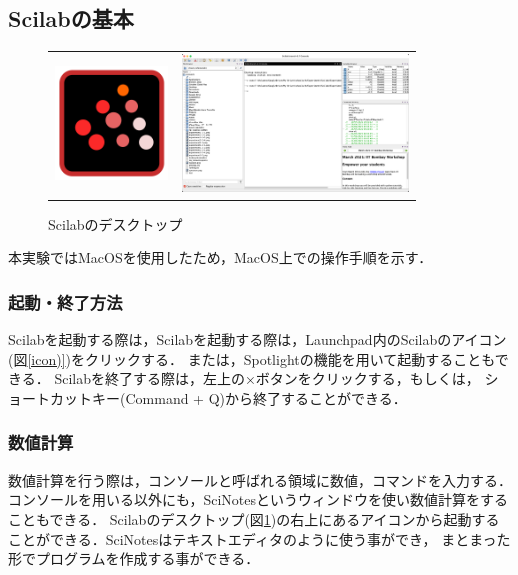\documentclass[a4paper,11pt]{jsarticle}
\begin{document}
  \subsection{Scilabの基本}
    \begin{figure}[H]
      \begin{tabular}{cc}
        \begin{minipage}[t]{0.48\textwidth}
          \centering
          \includegraphics[clip,width=3cm]{picture/icon.png}
          \caption{Scilabのアイコン}
          \label{icon}
        \end{minipage} &
        \begin{minipage}[t]{0.48\textwidth}
          \centering
          \includegraphics[clip,width=6cm]{picture/desktop.png}
          \caption{Scilabのデスクトップ}
          \label{desktop}
        \end{minipage}
      \end{tabular}
    \end{figure}
    本実験ではMacOSを使用したため，MacOS上での操作手順を示す．
      
    \subsubsection{起動・終了方法}
      Scilabを起動する際は，Scilabを起動する際は，Launchpad内のScilabのアイコン(図\ref{icon)})をクリックする．
      または，Spotlightの機能を用いて起動することもできる．
      Scilabを終了する際は，左上の×ボタンをクリックする，もしくは，
      ショートカットキー(Command + Q)から終了することができる．

    \subsubsection{数値計算}
      数値計算を行う際は，コンソールと呼ばれる領域に数値，コマンドを入力する．
      コンソールを用いる以外にも，SciNotesというウィンドウを使い数値計算をすることもできる．
      Scilabのデスクトップ(図\ref{desktop})の右上にあるアイコンから起動することができる．SciNotesはテキストエディタのように使う事ができ，
      まとまった形でプログラムを作成する事ができる．
\end{document}
